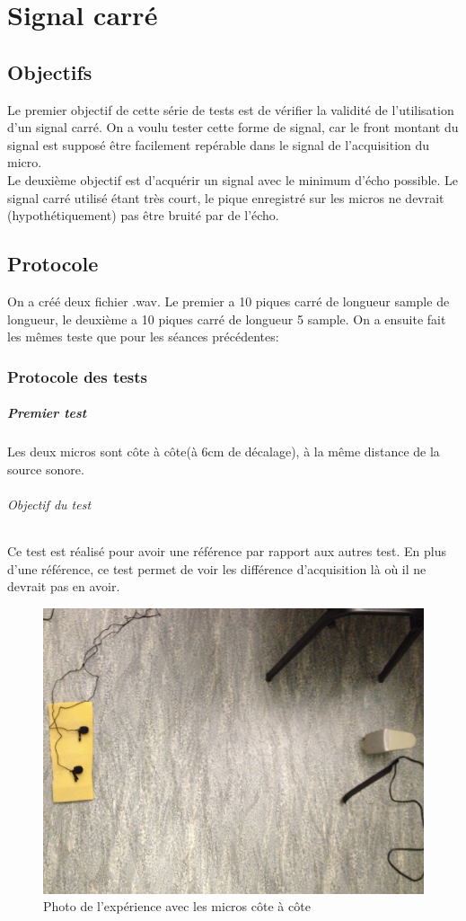 \documentclass[12pt,a4paper]{report}
\begin{document}
\chapter{Signal carré}\label{signal_carre}
\section{Objectifs}
Le premier objectif de cette série de tests est de vérifier la validité de l'utilisation d'un signal carré.
On a voulu tester cette forme de signal, car le front montant du signal est supposé être facilement repérable dans le signal de l'acquisition du micro. \\
Le deuxième objectif est d'acquérir un signal avec le minimum d'écho possible. Le signal carré utilisé étant très court, le pique enregistré sur les micros ne devrait (hypothétiquement) pas être bruité par de l'écho.

\section{Protocole}\label{protocole}
On a créé deux fichier .wav. Le premier a 10 piques carré de longueur sample de longueur, le deuxième a 10 piques carré de longueur 5 sample.
On a ensuite fait les mêmes teste que pour les séances précédentes:

\subsection{Protocole des tests}
 
 \paragraph{Premier test} 
 Les deux micros sont côte à côte(à 6cm de décalage), à la même distance de la source sonore.
 \subparagraph{Objectif du test}
 Ce test est réalisé pour avoir une référence par rapport aux autres test. En plus d'une référence, ce test permet de voir les différence d'acquisition là où il ne devrait pas en avoir.
 \begin{figure}[H]
 \includegraphics[width=\textwidth]{../tests/lecture_de_signaux_carres/donnees11-03/test_1.jpg} 
 \caption{Photo de l'expérience avec les micros côte à côte}
 \end{figure}
 	
\end{document}
